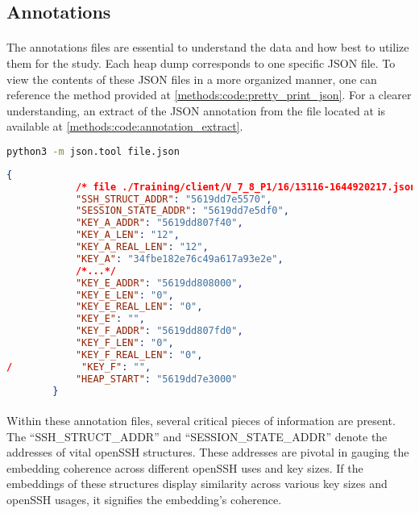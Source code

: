     \subsection*{Annotations}
        \paragraph{}The annotations files are essential to understand the data and how best to utilize them for the study. Each heap dump corresponds to one specific JSON file. To view the contents of these JSON files in a more organized manner, one can reference the method provided at \ref{methods:code:pretty_print_json}. For a clearer understanding, an extract of the JSON annotation from the file located at  is available at \ref{methods:code:annotation_extract}.

        \begin{lstlisting}[caption={pretty print JSON}, label=methods:code:pretty_print_json, language=bash]
            python3 -m json.tool file.json
        \end{lstlisting}

        \noindent
        \begin{minipage}{\linewidth}
        \begin{lstlisting}[language=json, caption={An extract of the JSON annotations}, label=methods:code:annotation_extract]
        {
            /* file ./Training/client/V_7_8_P1/16/13116-1644920217.json*/
            "SSH_STRUCT_ADDR": "5619dd7e5570",
            "SESSION_STATE_ADDR": "5619dd7e5df0",
            "KEY_A_ADDR": "5619dd807f40",
            "KEY_A_LEN": "12",
            "KEY_A_REAL_LEN": "12",
            "KEY_A": "34fbe182e76c49a617a93e2e",
            /*...*/
            "KEY_E_ADDR": "5619dd808000",
            "KEY_E_LEN": "0",
            "KEY_E_REAL_LEN": "0",
            "KEY_E": "",
            "KEY_F_ADDR": "5619dd807fd0",
            "KEY_F_LEN": "0",
            "KEY_F_REAL_LEN": "0",
/            "KEY_F": "",
            "HEAP_START": "5619dd7e3000"
        }
        \end{lstlisting}
        \end{minipage}

        \paragraph{}Within these annotation files, several critical pieces of information are present. The ``SSH\_STRUCT\_ADDR'' and ``SESSION\_STATE\_ADDR'' denote the addresses of vital openSSH \glspl{structure}. These addresses are pivotal in gauging the embedding coherence across different openSSH uses and key sizes. If the embeddings of these \glspl{structure} display similarity across various key sizes and openSSH usages, it signifies the embedding's coherence.

